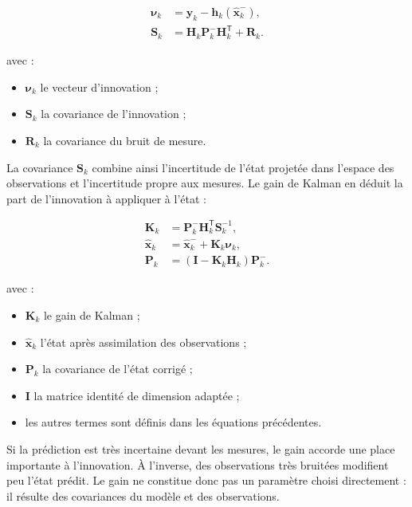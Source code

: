 \begin{align}
\boldsymbol\nu_k
&=
\mathbf y_k-\mathbf h_k(\widehat{\mathbf x}_k^-),
\\
\mathbf S_k
&=
\mathbf H_k\mathbf P_k^-\mathbf H_k^{\mathsf T}+\mathbf R_k.
\label{ann:eq:ekf_innovation}
\end{align}

avec :

\begin{itemize}
    \item $\boldsymbol\nu_k$ le vecteur d'innovation ;
    \item $\mathbf S_k$ la covariance de l'innovation ;
    \item $\mathbf R_k$ la covariance du bruit de mesure.
\end{itemize}

La covariance $\mathbf S_k$ combine ainsi l'incertitude de l'état projetée dans
l'espace des observations et l'incertitude propre aux mesures. Le gain de
Kalman en déduit la part de l'innovation à appliquer à l'état :

\begin{align}
\mathbf K_k
&=
\mathbf P_k^-\mathbf H_k^{\mathsf T}\mathbf S_k^{-1},
\\
\widehat{\mathbf x}_k
&=
\widehat{\mathbf x}_k^-+\mathbf K_k\boldsymbol\nu_k,
\\
\mathbf P_k
&=
\left(\mathbf I-\mathbf K_k\mathbf H_k\right)\mathbf P_k^-.
\label{ann:eq:ekf_update}
\end{align}

avec :

\begin{itemize}
    \item $\mathbf K_k$ le gain de Kalman ;
    \item $\widehat{\mathbf x}_k$ l'état après assimilation des observations ;
    \item $\mathbf P_k$ la covariance de l'état corrigé ;
    \item $\mathbf I$ la matrice identité de dimension adaptée ;
    \item les autres termes sont définis dans les équations précédentes.
\end{itemize}

Si la prédiction est très incertaine devant les mesures, le gain accorde une
place importante à l'innovation. À l'inverse, des observations très bruitées
modifient peu l'état prédit. Le gain ne constitue donc pas un paramètre choisi
directement : il résulte des covariances du modèle et des observations.

